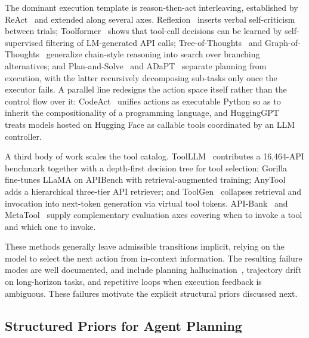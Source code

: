 The dominant execution template is reason-then-act interleaving, established by ReAct~\citep{yao2023react} and extended along several axes. Reflexion~\citep{shinn2023reflexion} inserts verbal self-criticism between trials; Toolformer~\citep{schick2023toolformer} shows that tool-call decisions can be learned by self-supervised filtering of LM-generated API calls; Tree-of-Thoughts~\citep{yao2023tree} and Graph-of-Thoughts~\citep{besta2024graph} generalize chain-style reasoning into search over branching alternatives; and Plan-and-Solve~\citep{wang2023plan} and ADaPT~\citep{prasad2024adapt} separate planning from execution, with the latter recursively decomposing sub-tasks only once the executor fails. A parallel line redesigns the action space itself rather than the control flow over it: CodeAct~\citep{wang2024executable} unifies actions as executable Python so as to inherit the compositionality of a programming language, and HuggingGPT~\citep{shen2023hugginggpt} treats models hosted on Hugging Face as callable tools coordinated by an LLM controller.

A third body of work scales the tool catalog. ToolLLM~\citep{qin2024toolllm} contributes a 16{,}464-API benchmark together with a depth-first decision tree for tool selection; Gorilla~\citep{patil2024gorilla} fine-tunes LLaMA on APIBench with retrieval-augmented training; AnyTool~\citep{du2024anytool} adds a hierarchical three-tier API retriever; and ToolGen~\citep{wang2025toolgen} collapses retrieval and invocation into next-token generation via virtual tool tokens. API-Bank~\citep{li2023api} and MetaTool~\citep{huang2024metatool} supply complementary evaluation axes covering when to invoke a tool and which one to invoke.

These methods generally leave admissible transitions implicit, relying on the model to select the next action from in-context information. The resulting failure modes are well documented, and include planning hallucination~\citep{zhu2025knowagent,xiao2024flowbench}, trajectory drift on long-horizon tasks, and repetitive loops when execution feedback is ambiguous. These failures motivate the explicit structural priors discussed next.

\subsection{Structured Priors for Agent Planning}
\label{app:priors-extended}

